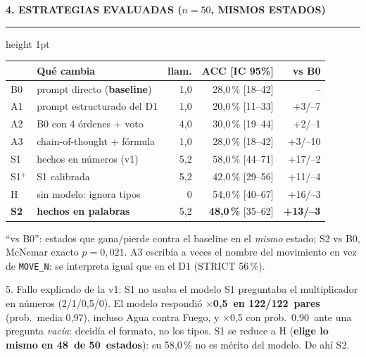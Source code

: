 \documentclass[10pt,a4paper]{extarticle}
\newcommand{\accBase}{28{,}0}
\newcommand{\accCot}{28{,}0}
\newcommand{\accHeur}{54{,}0}
\newcommand{\accPerm}{30{,}0}
\newcommand{\accScal}{42{,}0}
\newcommand{\accSone}{58{,}0}
\newcommand{\accStruct}{20{,}0}
\newcommand{\accStwo}{48{,}0}
\newcommand{\agreeSone}{48}
\newcommand{\callsBase}{1{,}0}
\newcommand{\callsCot}{1{,}0}
\newcommand{\callsPerm}{4{,}0}
\newcommand{\callsScal}{5{,}2}
\newcommand{\callsSone}{5{,}2}
\newcommand{\callsStruct}{1{,}0}
\newcommand{\callsStwo}{5{,}2}
\newcommand{\ciBase}{18--42}
\newcommand{\ciCot}{18--42}
\newcommand{\ciHeur}{40--67}
\newcommand{\ciPerm}{19--44}
\newcommand{\ciScal}{29--56}
\newcommand{\ciSone}{44--71}
\newcommand{\ciStruct}{11--33}
\newcommand{\ciStwo}{35--62}
\newcommand{\lossCot}{10}
\newcommand{\lossHeur}{3}
\newcommand{\lossPerm}{1}
\newcommand{\lossScal}{4}
\newcommand{\lossSone}{2}
\newcommand{\lossStruct}{7}
\newcommand{\lossStwo}{3}
\newcommand{\nStates}{50}
\newcommand{\pStwo}{0{,}021}
\newcommand{\priorHalf}{0{,}90}
\newcommand{\sOneModal}{0{,}5}
\newcommand{\sOneModalProb}{0{,}97}
\newcommand{\sOneModalShare}{122/122}
\newcommand{\strictCot}{56}
\newcommand{\winCot}{3}
\newcommand{\winHeur}{16}
\newcommand{\winPerm}{2}
\newcommand{\winScal}{11}
\newcommand{\winSone}{17}
\newcommand{\winStruct}{3}
\newcommand{\winStwo}{13}
\newcommand{\heading}[1]{%
  \par\vspace{1.2mm}\noindent
  {\color{navy}\bfseries\small\MakeUppercase{#1}}\par\vspace{0.5mm}
  {\color{amber}\hrule height 1pt}\vspace{0.9mm}\noindent\ignorespaces}
\begin{document}
\begin{minipage}[t]{0.488\linewidth}
\heading{4. Estrategias evaluadas ($n = \nStates$, mismos estados)}
{\centering\footnotesize
\begin{tabular}{@{}llrrr@{}}
\toprule
& \textbf{Qu\'e cambia} & \textbf{llam.} & \textbf{ACC [IC 95\%]} & \textbf{vs B0}\\
\midrule
B0 & prompt directo (\textbf{baseline}) & \callsBase & \accBase\,\% [\ciBase] & --\\
A1 & prompt estructurado del D1 & \callsStruct & \accStruct\,\% [\ciStruct] & +\winStruct/--\lossStruct\\
A2 & B0 con 4 \'ordenes + voto & \callsPerm & \accPerm\,\% [\ciPerm] & +\winPerm/--\lossPerm\\
A3 & chain-of-thought + f\'ormula & \callsCot & \accCot\,\% [\ciCot] & +\winCot/--\lossCot\\
S1 & hechos en n\'umeros (v1) & \callsSone & \accSone\,\% [\ciSone] & +\winSone/--\lossSone\\
S1$^{+}$ & S1 calibrada & \callsScal & \accScal\,\% [\ciScal] & +\winScal/--\lossScal\\
H & sin modelo: ignora tipos & 0 & \accHeur\,\% [\ciHeur] & +\winHeur/--\lossHeur\\
\textbf{S2} & \textbf{hechos en palabras} & \callsStwo & \textbf{\accStwo\,\%} [\ciStwo] & \textbf{+\winStwo/--\lossStwo}\\
\bottomrule
\end{tabular}\par}
\vspace{0.3mm}
{\scriptsize ``vs B0'': estados que gana/pierde contra el baseline en el \emph{mismo} estado; S2 vs B0, McNemar exacto $p=\pStwo$. A3 escrib\'ia a veces el nombre del movimiento en vez de \texttt{MOVE\_N}: se interpreta igual que en el D1 (STRICT \strictCot\,\%).}
\vspace{0.9mm}
\begin{failbox}{5. Fallo explicado de la v1: S1 no usaba el modelo}
\footnotesize S1 preguntaba el multiplicador en n\'umeros (2/1/0{,}5/0). El modelo respondi\'o \textbf{$\times$\sOneModal\ en \sOneModalShare\ pares} (prob.\ media \sOneModalProb), incluso Agua contra Fuego, y $\times$0{,}5 con prob.\ \priorHalf\ ante una pregunta \emph{vac\'ia}: decid\'ia el formato, no los tipos. S1 se reduce a H (\textbf{elige lo mismo en \agreeSone\ de \nStates\ estados}): su \accSone\,\% no es m\'erito del modelo. De ah\'i S2.
\end{failbox}
\end{minipage}\hfill
\end{document}
